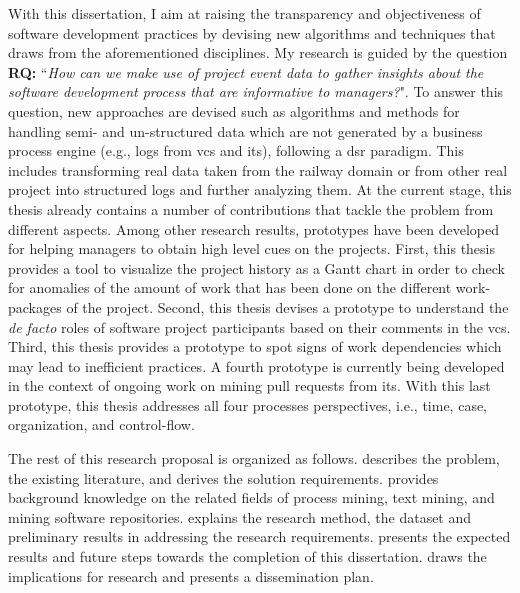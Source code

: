 With this dissertation, I aim at raising the transparency and objectiveness of software development practices by devising new algorithms and techniques that draws from the aforementioned disciplines. 
 My research is guided by the question \textbf{RQ:} ``\emph{How can we make use of project event data to gather insights about the software development process that are informative to managers?}". 
To answer this question, new approaches are devised such as algorithms and methods for handling semi- and un-structured data which are not generated by a business process engine  (e.g., logs from \gls{vcs} and \gls{its}), following a \gls{dsr} paradigm. This includes transforming real data taken from the railway  domain or from other real project  into structured logs and further analyzing them. At the current stage, this thesis already contains a number of contributions that tackle the problem from different aspects. Among other research results, prototypes have been developed for helping managers to obtain high level cues on the projects. First, this thesis provides a tool to visualize the project history as a Gantt chart in order to check for anomalies of the amount of work that has been done on the different work-packages of the project. Second, this thesis devises a prototype to understand the \emph{de facto} roles of software project participants based on their comments in the \gls{vcs}. Third, this thesis provides a prototype to spot signs of work dependencies which may lead to inefficient practices. A fourth prototype is currently being developed in the context of ongoing work on mining pull requests from \gls{its}. With this last prototype, this thesis  addresses all four processes perspectives, i.e., time, case, organization, and control-flow.

The rest of this research proposal is organized as follows.  describes the problem, the existing literature, and derives the solution requirements.  provides background knowledge on the related fields of process mining, text mining, and mining software repositories.  explains the research method, the dataset and preliminary results in addressing the research requirements.  presents the expected results and future steps towards the completion of this dissertation.  draws the implications for research and presents a dissemination plan.